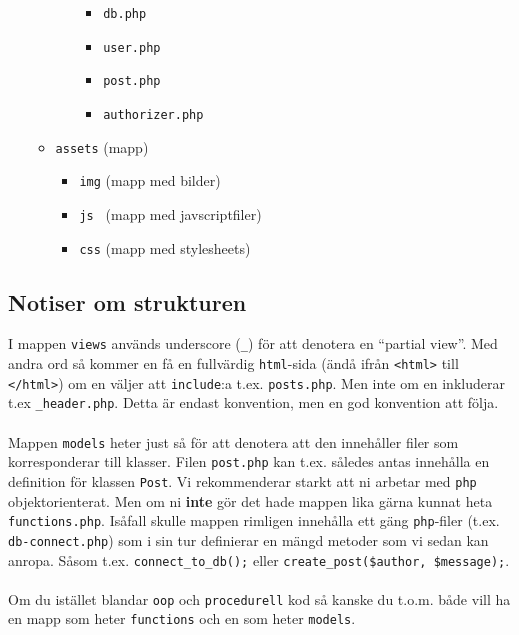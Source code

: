 \documentclass[12pt]{article}
\begin{document}
\begin{itemize}
\begin{itemize}
\begin{itemize}
\begin{itemize}
          \item \texttt{db.php}
          \item \texttt{user.php}
          \item \texttt{post.php}
          \item \texttt{authorizer.php}
        \end{itemize}
      \end{itemize}
      \item \texttt{assets} (mapp)
      \begin{itemize}
        \item \texttt{img} (mapp med bilder)
        \item \texttt{js  } (mapp med javscriptfiler)
        \item \texttt{css} (mapp med stylesheets)
      \end{itemize}
    \end{itemize}
  \end{itemize}


\subsection{Notiser om strukturen}
I mappen \texttt{views} används underscore (\texttt{\_}) för att denotera en ``partial view''. Med andra ord så kommer en få en fullvärdig \texttt{html}-sida (ändå ifrån \texttt{<html>} till \texttt{</html>}) om en väljer att \texttt{include}:a t.ex. \texttt{posts.php}. Men inte om en inkluderar t.ex \texttt{\_header.php}. Detta är endast konvention, men en god konvention att följa.

\paragraph{}
Mappen \texttt{models} heter just så för att denotera att den innehåller filer som korresponderar till klasser. Filen \texttt{post.php} kan t.ex. således antas innehålla en definition för klassen \texttt{Post}. Vi rekommenderar starkt att ni arbetar med \texttt{php} objektorienterat. Men om ni \textbf{inte} gör det hade mappen lika gärna kunnat heta \texttt{functions.php}. Isåfall skulle mappen rimligen innehålla ett gäng \texttt{php}-filer (t.ex. \texttt{db-connect.php}) som i sin tur definierar en mängd metoder som vi sedan kan anropa. Såsom t.ex. \texttt{connect\_to\_db();} eller \texttt{create\_post(\$author, \$message);}.

\paragraph{}
Om du istället blandar \texttt{oop} och \texttt{procedurell} kod så kanske du t.o.m. både vill ha en mapp som heter \texttt{functions} och en som heter \texttt{models}.
\end{document}
